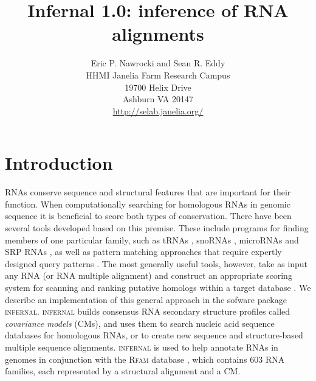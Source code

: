 \documentclass[11pt]{article}
\begin{document}
\title{Infernal 1.0: inference of RNA alignments}
\author{Eric P. Nawrocki and Sean R. Eddy\\
HHMI Janelia Farm Research Campus\\
19700 Helix Drive\\
Ashburn VA 20147\\
\url{http://selab.janelia.org/}\\
}
\maketitle



\section{Introduction}

RNAs conserve sequence and structural features that are important for their
function.  When computationally searching for homologous RNAs in
genomic sequence it is beneficial to score both types of conservation.
There have been several tools developed based on this premise.  These
include programs for finding members of one particular family, such as
tRNAs \cite{LoweEddy97,Laslett04}, snoRNAs
\cite{LoweEddy99,Schattner06}, microRNAs \cite{Lai03,Lim03} and SRP
RNAs \cite{Lai03,Lim03}, as well as pattern matching approaches that
require expertly designed query patterns \cite{Macke01}. The most
generally useful tools, however, take as input any RNA (or RNA
multiple alignment) and construct an appropriate scoring system for
scanning and ranking putative homologs within a target database
\cite{Gautheret01,ZhangBafna05}. We describe an implementation of this
general approach in the sofware package \textsc{infernal}.
\textsc{infernal} builds consensus RNA secondary structure profiles
called \emph{covariance models} (CMs), and uses them to search nucleic
acid sequence databases for homologous RNAs, or to create new sequence
and structure-based multiple sequence alignments.  \textsc{infernal}
is used to help annotate RNAs in genomes in conjunction with the
\textsc{Rfam} database \cite{Griffiths-Jones05}, which contains 603
RNA families, each represented by a structural alignment and a CM.
\end{document}
